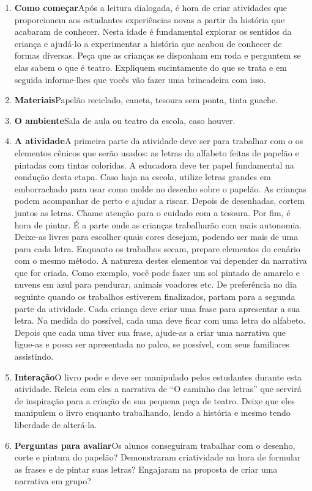 \documentclass[11pt]{extarticle}
\begin{document}
\begin{enumerate}
\item \textbf{Como começar}\quad Após a leitura dialogada, é hora de criar 
atividades que proporcionem aos estudantes experiências novas a partir da história 
que acabaram de conhecer. Nesta idade é fundamental explorar os sentidos da criança e 
ajudá-lo a experimentar a história que acabou de conhecer de formas diversas. 
Peça que as crianças se disponham em roda e perguntem se elas sabem o que é teatro.
Expliquem sucintamente do que se trata e em seguida informe-lhes que vocês vão
fazer uma brincadeira com isso.

\item \textbf{Materiais}\quad Papelão reciclado, caneta, tesoura sem ponta, tinta guache.
\item \textbf{O ambiente}\quad Sala de aula ou teatro da escola, caso houver.

\item \textbf{A atividade}\quad A primeira parte da atividade deve ser para
trabalhar com o os elementos cênicos que serão usados: as letras do alfabeto
feitas de papelão e pintadas com tintas coloridas. 
A educadora deve ter papel fundamental na condução desta etapa. 
Caso haja na escola, utilize letras grandes em emborrachado para usar
como molde no desenho sobre o papelão. 
As crianças podem acompanhar de perto e ajudar a riscar.
Depois de desenhadas, cortem juntos as letras. Chame atenção para o cuidado com 
a tesoura. 
Por fim, é hora de pintar. É a parte onde as crianças trabalharão com mais autonomia.
Deixe-as livres para escolher quais cores desejam, podendo ser mais de uma para
cada letra. 
Enquanto os trabalhos secam, prepare elementos do cenário com o mesmo método.
A natureza destes elementos vai depender da narrativa que for criada. 
Como exemplo, você pode fazer um sol pintado de amarelo e nuvens em azul para pendurar,
animais voadores etc. 
De preferência no dia seguinte quando os trabalhos estiverem finalizados, partam para a 
segunda parte da atividade. 
Cada criança deve criar uma frase para apresentar a sua letra. 
Na medida do possível, cada uma deve ficar com uma letra do alfabeto. 
Depois que cada uma tiver sua frase, ajude-as a criar uma narrativa que ligue-as
e possa ser apresentada no palco, se possível, com seus familiares assistindo. 

\item \textbf{Interação}\quad O livro pode e deve ser 
manipulado pelos estudantes durante esta atividade. 
Releia com eles a narrativa de ``O caminho das letras'' que servirá
de inspiração para a criação de sua pequena peça de teatro. 
Deixe que eles manipulem o livro enquanto trabalhando, lendo
a história e mesmo tendo liberdade de alterá-la.

\item \textbf{Perguntas para avaliar}\quad Os alunos conseguiram trabalhar com 
o desenho, corte e pintura do papelão?
Demonstraram criatividade na hora de formular as frases e de pintar suas letras?
Engajaram na proposta de criar uma narrativa em grupo?
\end{enumerate}
\end{document}
